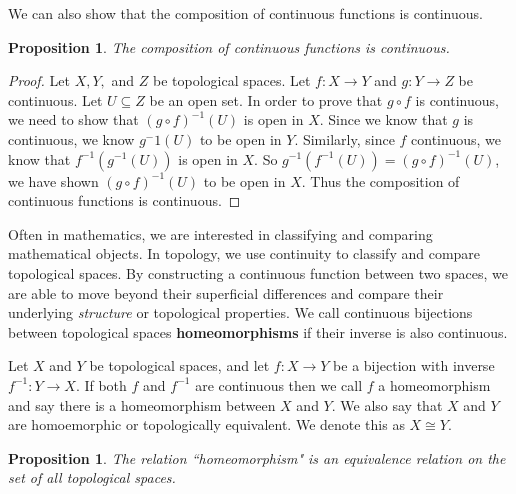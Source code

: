 \documentclass[12pt,oneside]{amsbook}
\newtheorem{prop}[thm]{Proposition}
\newenvironment{defn}[1][Definition.]{\begin{trivlist}
\item[\hskip \labelsep {\bfseries #1}]}{\end{trivlist}}
\begin{document}
We can also show that the composition of continuous functions is continuous. 

\begin{prop}
The composition of continuous functions is continuous. 
\end{prop}

\begin{proof}
Let $X,Y,$ and $Z$ be topological spaces. Let $f\colon X \rightarrow Y$ and $g\colon Y\rightarrow Z$ be continuous. Let $U \subseteq Z$ be an open set. In order to prove that $g\circ f$ is continuous, we need to show that $(g\circ f)^{-1}(U)$ is open in $X$. Since we know that $g$ is continuous, we know $g^-1(U)$ to be open in $Y$. Similarly, since $f$ continuous, we know that $f^{-1}(g^{-1}(U))$ is open in $X$. So $g^{-1}(f^{-1}(U))=(g\circ f)^{-1}(U)$, we have shown $(g\circ f)^{-1}(U)$ to be open in $X$. Thus the composition of continuous functions is continuous. 
\end{proof}

Often in mathematics, we are interested in classifying and comparing mathematical objects. In topology, we use continuity to classify and compare topological spaces. By constructing a continuous function between two spaces, we are able to move beyond their superficial differences and compare their underlying \textit{structure} or topological properties. We call continuous bijections between topological spaces \textbf{homeomorphisms} if their inverse is also continuous.


\begin{defn}
Let $X$ and $Y$ be topological spaces, and let $f\colon X\rightarrow Y$ be a bijection with inverse $f^{-1}\colon Y \rightarrow X$. If both $f$ and $f^{-1}$ are continuous then we call $f$ a homeomorphism and say there is a homeomorphism between $X$ and $Y$. We also say that $X$ and $Y$ are homoemorphic or topologically equivalent. We denote this as $X\cong Y$. 
\end{defn}

\begin{prop}
The relation ``homeomorphism" is an equivalence relation on the set of all topological spaces.
\end{prop}
\end{document}
